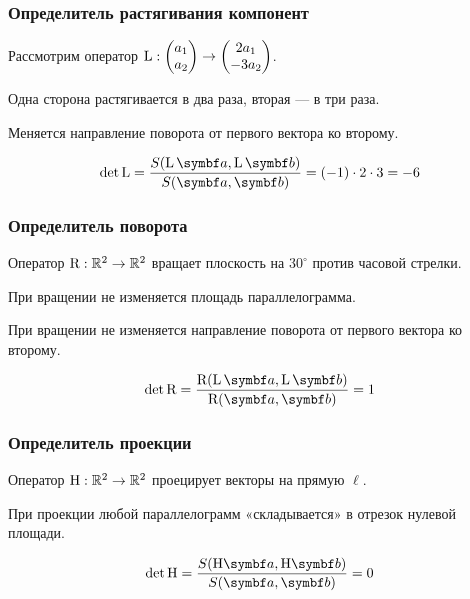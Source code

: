 \begin{frame}
    \frametitle{Определитель растягивания компонент}


    Рассмотрим оператор $\operatorname{L} : \begin{pmatrix}
      a_1 \\
      a_2 \\
    \end{pmatrix} \to 
    \begin{pmatrix}
      2a_1 \\
      -3a_2 \\
    \end{pmatrix}$.
    

    \pause

    Одна сторона растягивается в два раза, вторая — в три раза.


    Меняется направление поворота от первого вектора ко второму. 

    \pause

    \[
    \det \LL = \frac{S(\LL \ba, \LL \bb )}{S(\ba, \bb )} = (-1)\cdot 2\cdot 3 = -6
    \]

\end{frame}




\begin{frame}
    \frametitle{Определитель поворота}


    Оператор $\mathrm{R}: \mathbb{R}^2 \to \mathbb{R}^2$ вращает плоскость на $30^{\circ}$ против часовой стрелки.

    \pause

    При вращении не изменяется площадь параллелограмма.

    При вращении не изменяется направление поворота от первого вектора ко второму.

    \pause

    \[
    \det \Rot = \frac{\Rot(\LL \ba, \LL \bb )}{\Rot(\ba, \bb )} = 1     
    \]

\end{frame}


\begin{frame}
    \frametitle{Определитель проекции}


    Оператор $\mathrm{H}: \mathbb{R}^2 \to \mathbb{R}^2$ проецирует векторы на прямую $\ell$.  

    \pause

    При проекции любой параллелограмм «складывается» в отрезок нулевой площади.

    \pause

    \[
    \det \HH = \frac{S(\HH \ba, \HH \bb )}{S(\ba, \bb )} = 0     
    \]

\end{frame}



